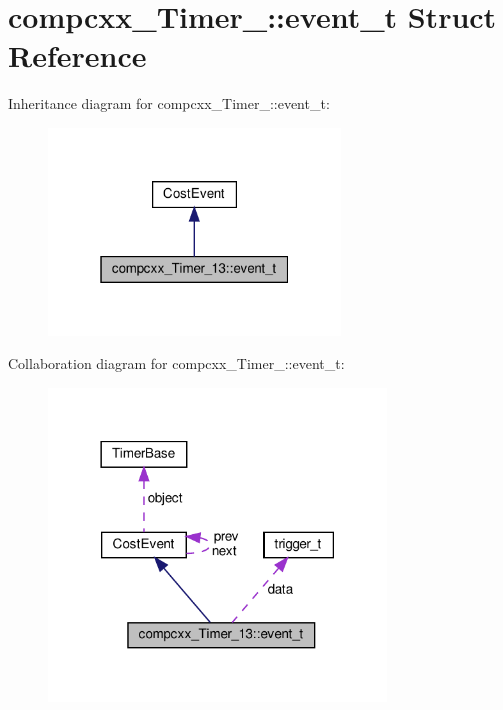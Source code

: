 \hypertarget{structcompcxx__Timer__13_1_1event__t}{}\section{compcxx\+\_\+\+Timer\+\_\+:\+:event\+\_\+t Struct Reference}
\label{structcompcxx__Timer__13_1_1event__t}


Inheritance diagram for compcxx\+\_\+\+Timer\+\_\+:\+:event\+\_\+t\+:\nopagebreak
\begin{figure}[H]
\begin{center}
\leavevmode
\includegraphics[width=220pt]{structcompcxx__Timer__13_1_1event__t__inherit__graph}
\end{center}
\end{figure}


Collaboration diagram for compcxx\+\_\+\+Timer\+\_\+:\+:event\+\_\+t\+:\nopagebreak
\begin{figure}[H]
\begin{center}
\leavevmode
\includegraphics[width=254pt]{structcompcxx__Timer__13_1_1event__t__coll__graph}
\end{center}
\end{figure}
